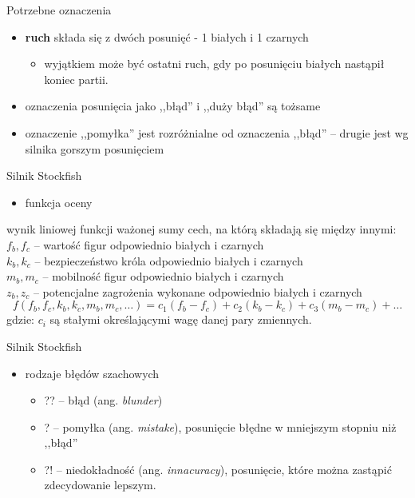\documentclass{beamer}
\begin{document}
\begin{frame}{Potrzebne oznaczenia}
	\begin{itemize}
		\item \textbf{ruch} składa się z dwóch posunięć - 1 białych i 1 czarnych
			\begin{itemize}
			\item wyjątkiem może być ostatni ruch, gdy po posunięciu białych nastąpił koniec partii.
			\end{itemize}
		\item oznaczenia posunięcia jako ,,błąd'' i ,,duży błąd'' są tożsame
		\item oznaczenie ,,pomyłka'' jest rozróżnialne od oznaczenia ,,błąd'' -- drugie jest wg silnika gorszym posunięciem
	\end{itemize}
\end{frame}


\begin{frame}{Silnik Stockfish}
	\begin{itemize}
		\item funkcja oceny
	\end{itemize}
	wynik liniowej funkcji 
	ważonej sumy cech, na którą składają się między innymi:\\
	$f_b,f_c$ -- wartość figur odpowiednio białych i czarnych\\
	$k_b,k_c$ -- bezpieczeństwo króla odpowiednio białych i czarnych\\
	$m_b,m_c$ -- mobilność figur odpowiednio białych i czarnych\\
	$z_b,z_c$ -- potencjalne zagrożenia wykonane odpowiednio białych i czarnych\\
	\begin{equation*}
		f(f_b,f_c,k_b,k_c,m_b,m_c,\dots)=c_1(f_b-f_c)+c_2(k_b-k_c)+c_3(m_b-m_c)+\dots
	\end{equation*}
	gdzie:
	$c_i$ są stałymi określającymi wagę danej pary zmiennych.
\end{frame}

\begin{frame}{Silnik Stockfish}
	\begin{itemize}
		\item rodzaje błędów szachowych
		\begin{itemize}
			\item ??\hphantom{!} -- błąd (ang. \textit{blunder})
			\item ?\hphantom{?!}  -- pomyłka (ang. \textit{mistake}), posunięcie błędne w mniejszym stopniu niż ,,błąd''
			\item ?!\hphantom{?} -- niedokładność  (ang. \textit{innacuracy}), posunięcie, które można zastąpić zdecydowanie lepszym.
		\end{itemize}
	\end{itemize}
\end{frame}
\end{document}
